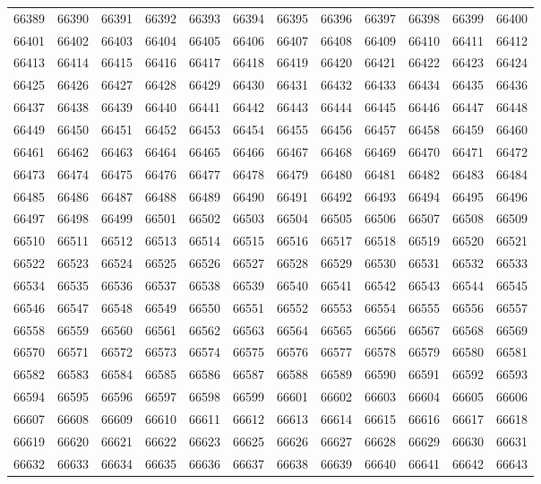 \begin{center}
\begin{longtable}{llllllllllll}
66389 &66390 &66391 &66392 &66393 &66394 &66395 &66396 &66397 &66398 &66399 &66400 \\
66401 &66402 &66403 &66404 &66405 &66406 &66407 &66408 &66409 &66410 &66411 &66412 \\
66413 &66414 &66415 &66416 &66417 &66418 &66419 &66420 &66421 &66422 &66423 &66424 \\
66425 &66426 &66427 &66428 &66429 &66430 &66431 &66432 &66433 &66434 &66435 &66436 \\
66437 &66438 &66439 &66440 &66441 &66442 &66443 &66444 &66445 &66446 &66447 &66448 \\
66449 &66450 &66451 &66452 &66453 &66454 &66455 &66456 &66457 &66458 &66459 &66460 \\
66461 &66462 &66463 &66464 &66465 &66466 &66467 &66468 &66469 &66470 &66471 &66472 \\
66473 &66474 &66475 &66476 &66477 &66478 &66479 &66480 &66481 &66482 &66483 &66484 \\
66485 &66486 &66487 &66488 &66489 &66490 &66491 &66492 &66493 &66494 &66495 &66496 \\
66497 &66498 &66499 &66501 &66502 &66503 &66504 &66505 &66506 &66507 &66508 &66509 \\
66510 &66511 &66512 &66513 &66514 &66515 &66516 &66517 &66518 &66519 &66520 &66521 \\
66522 &66523 &66524 &66525 &66526 &66527 &66528 &66529 &66530 &66531 &66532 &66533 \\
66534 &66535 &66536 &66537 &66538 &66539 &66540 &66541 &66542 &66543 &66544 &66545 \\
66546 &66547 &66548 &66549 &66550 &66551 &66552 &66553 &66554 &66555 &66556 &66557 \\
66558 &66559 &66560 &66561 &66562 &66563 &66564 &66565 &66566 &66567 &66568 &66569 \\
66570 &66571 &66572 &66573 &66574 &66575 &66576 &66577 &66578 &66579 &66580 &66581 \\
66582 &66583 &66584 &66585 &66586 &66587 &66588 &66589 &66590 &66591 &66592 &66593 \\
66594 &66595 &66596 &66597 &66598 &66599 &66601 &66602 &66603 &66604 &66605 &66606 \\
66607 &66608 &66609 &66610 &66611 &66612 &66613 &66614 &66615 &66616 &66617 &66618 \\
66619 &66620 &66621 &66622 &66623 &66625 &66626 &66627 &66628 &66629 &66630 &66631 \\
66632 &66633 &66634 &66635 &66636 &66637 &66638 &66639 &66640 &66641 &66642 &66643 \\

\end{longtable}
\end{center}
